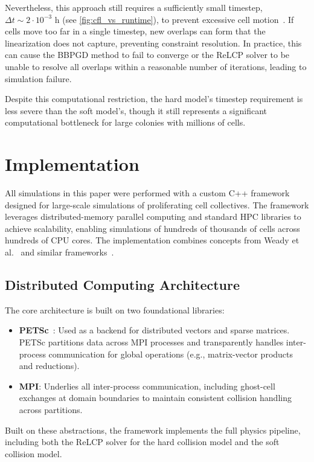 \documentclass[conference]{IEEEtran}
\begin{document}
Nevertheless, this approach still requires a sufficiently small timestep, $\Delta t \sim 2 \cdot 10^{-3}$ h (see \autoref{fig:cfl_vs_runtime}), to prevent excessive cell motion~\cite{Yan2022}. If cells move too far in a single timestep, new overlaps can form that the linearization does not capture, preventing constraint resolution. In practice, this can cause the BBPGD method to fail to converge or the ReLCP solver to be unable to resolve all overlaps within a reasonable number of iterations, leading to simulation failure.

Despite this computational restriction, the hard model's timestep requirement is less severe than the soft model's, though it still represents a significant computational bottleneck for large colonies with millions of cells.

\section{Implementation}

All simulations in this paper were performed with a custom C++ framework designed for large-scale simulations of proliferating cell collectives. The framework leverages distributed-memory parallel computing and standard HPC libraries to achieve scalability, enabling simulations of hundreds of thousands of cells across hundreds of CPU cores. The implementation combines concepts from Weady et al.~\cite{Weady2024SM} and similar frameworks~\cite{Tasora2008,Yan2019}.

\subsection{Distributed Computing Architecture}

The core architecture is built on two foundational libraries:
\begin{itemize}
    \item \textbf{PETSc}~\cite{petsc-web-page}: Used as a backend for distributed vectors and sparse matrices. PETSc partitions data across MPI processes and transparently handles inter-process communication for global operations (e.g., matrix-vector products and reductions).
    \item \textbf{MPI}: Underlies all inter-process communication, including ghost-cell exchanges at domain boundaries to maintain consistent collision handling across partitions.
\end{itemize}

Built on these abstractions, the framework implements the full physics pipeline, including both the ReLCP solver for the hard collision model and the soft collision model.
\end{document}
